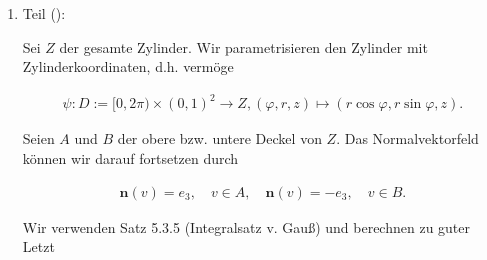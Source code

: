 \begin{solution}
\begin{enumerate}
    \item Teil ():
    
    Sei $Z$ der gesamte Zylinder.
    Wir parametrisieren den Zylinder mit Zylinderkoordinaten, d.h. vermöge

    \begin{align*}
        \psi:
            D := [0, 2 \pi) \times (0, 1)^2 \to Z,
            (\varphi, r, z) \mapsto (r \cos \varphi, r \sin \varphi, z).
    \end{align*}

    Seien $A$ und $B$ der obere bzw. untere Deckel von $Z$.
    Das Normalvektorfeld können wir darauf fortsetzen durch

    \begin{align*}
        \mathbf n(v) =  e_3,
        \quad
        v \in A,
        \quad
        \mathbf n(v) = -e_3,
        \quad
        v \in B.
    \end{align*}


    Wir verwenden Satz 5.3.5 (Integralsatz v. Gauß) und berechnen zu guter Letzt


\end{enumerate}
\end{solution}
